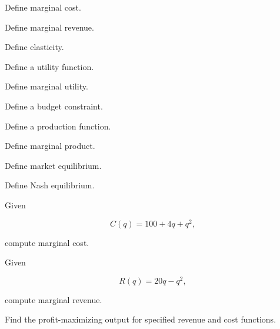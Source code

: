 \begin{exercise}[1]
Define marginal cost.
\end{exercise}

\begin{exercise}[1]
Define marginal revenue.
\end{exercise}

\begin{exercise}[1]
Define elasticity.
\end{exercise}

\begin{exercise}[1]
Define a utility function.
\end{exercise}

\begin{exercise}[1]
Define marginal utility.
\end{exercise}

\begin{exercise}[1]
Define a budget constraint.
\end{exercise}

\begin{exercise}[1]
Define a production function.
\end{exercise}

\begin{exercise}[1]
Define marginal product.
\end{exercise}

\begin{exercise}[1]
Define market equilibrium.
\end{exercise}

\begin{exercise}[1]
Define Nash equilibrium.
\end{exercise}

\begin{exercise}[2]
Given

\[
C(q)=100+4q+q^2,
\]

compute marginal cost.
\end{exercise}

\begin{exercise}[2]
Given

\[
R(q)=20q-q^2,
\]

compute marginal revenue.
\end{exercise}

\begin{exercise}[2]
Find the profit-maximizing output for specified revenue and cost functions.
\end{exercise}

